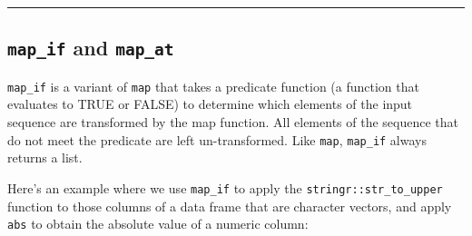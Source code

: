 \documentclass[]{book}
\newenvironment{Shaded}{\begin{snugshade}}{\end{snugshade}}
\newcommand{\CommentTok}[1]{\textcolor[rgb]{0.56,0.35,0.01}{\textit{#1}}}
\newcommand{\DecValTok}[1]{\textcolor[rgb]{0.00,0.00,0.81}{#1}}
\newcommand{\KeywordTok}[1]{\textcolor[rgb]{0.13,0.29,0.53}{\textbf{#1}}}
\newcommand{\NormalTok}[1]{#1}
\newcommand{\StringTok}[1]{\textcolor[rgb]{0.31,0.60,0.02}{#1}}
\theoremstyle{definition}
\theoremstyle{definition}
\theoremstyle{definition}
\theoremstyle{remark}
\begin{document}
\begin{center}\rule{0.5\linewidth}{\linethickness}\end{center}

\hypertarget{map_if-and-map_at}{%
\subsection{\texorpdfstring{\texttt{map\_if} and
\texttt{map\_at}}{map\_if and map\_at}}\label{map_if-and-map_at}}

\texttt{map\_if} is a variant of \texttt{map} that takes a predicate
function (a function that evaluates to TRUE or FALSE) to determine which
elements of the input sequence are transformed by the map function. All
elements of the sequence that do not meet the predicate are left
un-transformed. Like \texttt{map}, \texttt{map\_if} always returns a
list.

Here's an example where we use \texttt{map\_if} to apply the
\texttt{stringr::str\_to\_upper} function to those columns of a data
frame that are character vectors, and apply \texttt{abs} to obtain the
absolute value of a numeric column:

\begin{Shaded}
\end{Shaded}
\end{document}
